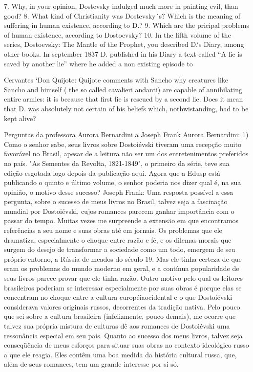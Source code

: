 7. Why, in your opinion, Dostevsky indulged much more in painting evil,
than good? 8. What kind of Christianity was Dostevsky´s? Which is the
meaning of suffering in human existence, according to D.? 9. Which are
the pricipal problems of human existence, according to Dostoevsky? 10.
In the fifth volume of the series, Dostoevsky: The Mantle of the
Prophet, you described D.`s Diary, among other books. In september 1837
D. published in his Diary a text called ``A lie is saved by another
lie'' where he added a non existing episode to

Cervantes `Don Quijote: Quijote comments with Sancho why creatures like
Sancho and himself ( the so called cavalieri andanti) are capable of
annihilating entire armies: it is because that first lie is rescued by a
second lie. Does it mean that D. was absolutely not certain of his
beliefs which, nothwistanding, had to be kept alive?

Perguntas da professora Aurora Bernardini a Joseph Frank Aurora
Bernardini: 1) Como o senhor sabe, seus livros sobre Dostoiévski tiveram
uma recepção muito favorável no Brasil, apesar de a leitura não ser um
dos entretenimentos preferidos no país. "As Sementes da Revolta,
1821-1849", o primeiro da série, teve sua edição esgotada logo depois da
publicação aqui. Agora que a Edusp está publicando o quinto e último
volume, o senhor poderia nos dizer qual é, na sua opinião, o motivo
desse sucesso? Joseph Frank: Uma resposta possível a essa pergunta,
sobre o sucesso de meus livros no Brasil, talvez seja a fascinação
mundial por Dostoiévski, cujos romances parecem ganhar importância com o
passar do tempo. Muitas vezes me surpreende a extensão em que
encontramos referências a seu nome e suas obras até em jornais. Os
problemas que ele dramatiza, especialmente o choque entre razão e fé, e
os dilemas morais que surgem do desejo de transformar a sociedade como
um todo, emergem de seu próprio entorno, a Rússia de meados do século
19. Mas ele tinha certeza de que eram os problemas do mundo moderno em
geral, e a contínua popularidade de seus livros parece provar que ele
tinha razão. Outro motivo pelo qual os leitores brasileiros poderiam se
interessar especialmente por suas obras é porque elas se concentram no
choque entre a cultura européiaocidental e o que Dostoiévski considerava
valores originais russos, decorrentes da tradição nativa. Pelo pouco que
sei sobre a cultura brasileira (infelizmente, pouco demais), me ocorre
que talvez sua própria mistura de culturas dê aos romances de
Dostoiévski uma ressonância especial em seu país. Quanto ao sucesso dos
meus livros, talvez seja conseqüência de meus esforços para situar suas
obras no contexto ideológico russo a que ele reagia. Eles contêm uma boa
medida da história cultural russa, que, além de seus romances, tem um
grande interesse por si só.

